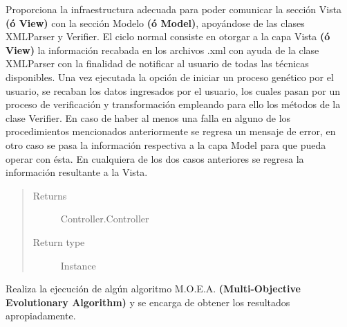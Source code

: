 \documentclass[class=report, crop=false]{standalone}
\begin{document}
\begin{fulllineitems}

\begin{DUlineblock}{0em}
\item[] Proporciona la infraestructura adecuada para poder comunicar la 
sección Vista \textbf{(ó View)} con la sección Modelo \textbf{(ó Model)}, 
apoyándose de las clases XMLParser y Verifier.\medskip\break
El ciclo normal consiste en otorgar a la capa Vista \textbf{(ó View)} la 
información recabada en los archivos .xml con ayuda de la clase XMLParser 
con la  finalidad de notificar al usuario de todas las técnicas 
disponibles.\break
Una vez ejecutada la opción de iniciar un proceso genético por el 
usuario, se recaban los datos ingresados por el usuario, los cuales 
pasan por un proceso de verificación y transformación empleando para ello 
los métodos de la clase Verifier.\break
En caso de haber al menos una falla en alguno de los procedimientos mencionados 
anteriormente se regresa un mensaje de error, en otro caso se pasa la información 
respectiva a la capa Model para que pueda operar con ésta.\medskip\break
En cualquiera de los dos casos anteriores se regresa la información resultante a 
la Vista.
\end{DUlineblock}

\begin{quote}\begin{description}
\item[{Returns}] \leavevmode
Controller.Controller
\item[{Return type}] \leavevmode
Instance
\end{description}\end{quote}

\begin{fulllineitems}

Realiza la ejecución de algún algoritmo M.O.E.A. \textbf{(Multi-Objective Evolutionary Algorithm)} 
y se encarga de obtener los resultados apropiadamente.


\end{fulllineitems}
\end{fulllineitems}
\end{document}
